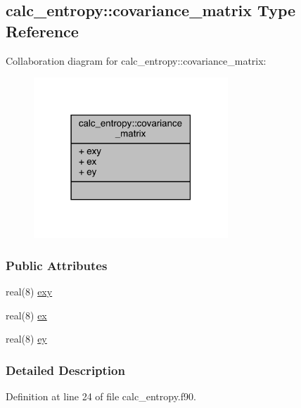 \hypertarget{structcalc__entropy_1_1covariance__matrix}{\subsection{calc\-\_\-entropy\-:\-:covariance\-\_\-matrix Type Reference}
\label{structcalc__entropy_1_1covariance__matrix}
}


Collaboration diagram for calc\-\_\-entropy\-:\-:covariance\-\_\-matrix\-:
\nopagebreak
\begin{figure}[H]
\begin{center}
\leavevmode
\includegraphics[width=207pt]{structcalc__entropy_1_1covariance__matrix__coll__graph}
\end{center}
\end{figure}
\subsubsection*{Public Attributes}
\begin{DoxyCompactItemize}
\item 
real(8) \hyperlink{structcalc__entropy_1_1covariance__matrix_af2db7d5370919cb7c9fa56cd45ff78cb}{exy}
\item 
real(8) \hyperlink{structcalc__entropy_1_1covariance__matrix_addc65f80d12b7a1c1852aa2d7e44180b}{ex}
\item 
real(8) \hyperlink{structcalc__entropy_1_1covariance__matrix_aa9a708e809193ff3d9bb3bc8e8827f58}{ey}
\end{DoxyCompactItemize}


\subsubsection{Detailed Description}


Definition at line 24 of file calc\-\_\-entropy.\-f90.



